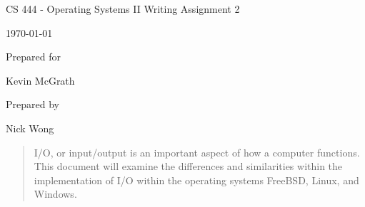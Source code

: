 \documentclass[onecolumn, draftclsnofoot,10pt, compsoc]{IEEEtran}
\def \GroupMemberOne{           Nick Wong}
\def \CapstoneSponsorPerson{        Kevin McGrath}
\def \DocType{    %
        Writing Assignment 2
        }
\newcommand{\NameSigPair}[1]{\par
\makebox[2.75in][r]{#1} \hfil   \makebox[3.25in]{\makebox[2.25in]{\hrulefill} \hfill    \makebox[.75in]{\hrulefill}}
\par\vspace{-12pt} \textit{\tiny\noindent
\makebox[2.75in]{} \hfil    \makebox[3.25in]{\makebox[2.25in][r]{Signature} \hfill  \makebox[.75in][r]{Date}}}}
\begin{document}
\begin{titlepage}
    \begin{singlespace}
        \hfill 
        \par\vspace{.2in}
        \centering
        \scshape{
            \huge CS 444 - Operating Systems II \DocType \par
            {\large\today}\par
            \vspace{.5in}
            \vfill
            {\large Prepared for}\par
            \vspace{5pt}
            {\CapstoneSponsorPerson\par}
            {\large Prepared by }\par
            \GroupMemberOne\par
            \vspace{5pt}
            \vspace{20pt}
        }
        \begin{abstract}
           I/O, or input/output is an important aspect of how a computer functions. This document will examine the differences and similarities within the implementation of I/O within the operating systems FreeBSD, Linux, and Windows. 

        \end{abstract}     
    \end{singlespace}
\end{titlepage}
\newpage
{}
\tableofcontents
\clearpage
\end{document}
